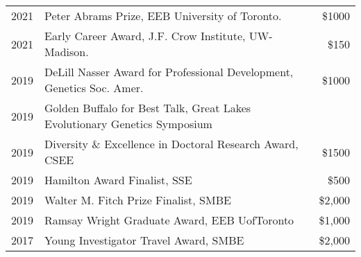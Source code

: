 \documentclass[12pt]{article}
\begin{document}
\begin{longtable}{llr}
 2021 & Peter Abrams Prize, EEB University of Toronto. &\$1000 \\
 2021 & Early Career Award, J.F. Crow Institute, UW-Madison. &\$150 \\
 2019 & DeLill Nasser Award for Professional Development, Genetics Soc. Amer. & \$1000 \\
 2019 & Golden Buffalo for Best Talk, Great Lakes Evolutionary Genetics Symposium \\
 2019 & Diversity \& Excellence in Doctoral Research Award, CSEE & \$1500 \\
  2019 & Hamilton Award Finalist, SSE & \$500 \\
  2019 & Walter M. Fitch Prize Finalist, SMBE & \$2,000 \\
  2019 & Ramsay Wright Graduate Award, EEB UofToronto & \$1,000 \\
  2017 & Young Investigator Travel Award, SMBE & \$2,000 \\

\end{longtable}



\end{document}
